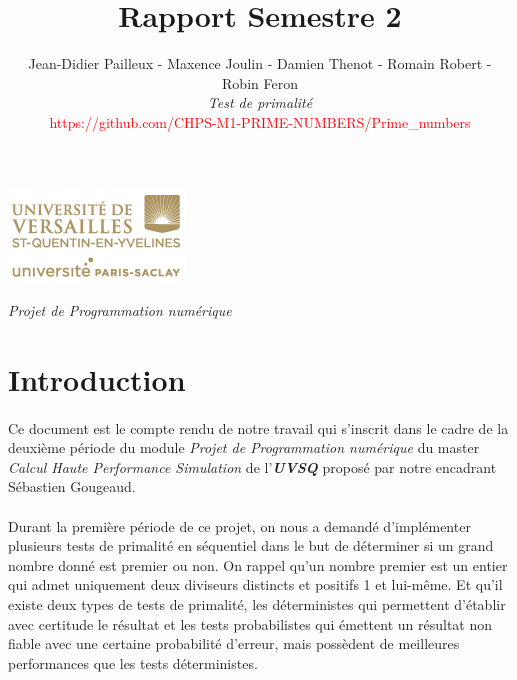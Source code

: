 

\title{\vspace{\fill}\textbf{\Huge Rapport Semestre 2}}
\author{Jean-Didier Pailleux - Maxence Joulin - Damien Thenot - Romain Robert - Robin Feron 
	\vspace{2em}\\
	\textit{Test de primalité}\\
	\textcolor{red}{https://github.com/CHPS-M1-PRIME-NUMBERS/Prime\_numbers}
	\vspace{2em}
}
\usepackage{algorithm}
\usepackage{algorithmic}
\usepackage{subcaption}

\clearpage
\maketitle\vspace{13em}
\begin{center}\includegraphics[scale=0.7]{logo.png}\end{center}
\begin{flushright}\textit{Projet de Programmation numérique}\end{flushright}
\newpage
\tableofcontents
\newpage\clearpage{}

	\section{Introduction}
	\paragraph{}Ce document est le compte rendu de notre travail qui s'inscrit dans le cadre de la deuxième période du module \textit{Projet de Programmation numérique} du master \textit{Calcul Haute Performance Simulation} de l'\textit{\textbf{UVSQ}} proposé par notre encadrant Sébastien Gougeaud.
	
	\paragraph{}Durant la première période de ce projet, on nous a demandé d'implémenter plusieurs tests de primalité en séquentiel dans le but de déterminer si un grand nombre donné est premier ou non. On rappel qu'un nombre premier est un entier qui admet uniquement deux diviseurs distincts et positifs 1 et lui-même. Et qu'il existe deux types de tests de primalité, les déterministes qui permettent d'établir avec certitude le résultat et les tests probabilistes qui émettent un résultat non fiable avec une certaine probabilité d'erreur, mais possèdent de meilleures performances que les tests déterministes.

